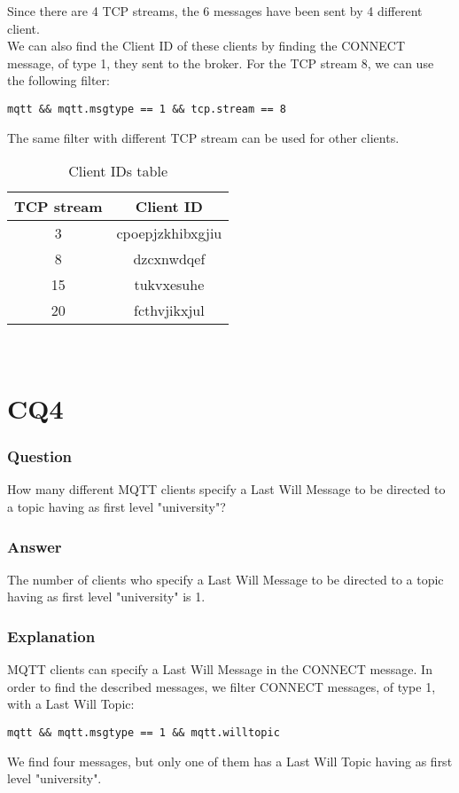 Since there are 4 TCP streams, the 6 messages have been sent by 4 different client.	\\
We can also find the Client ID of these clients by finding the CONNECT message, of type 1, they sent to the broker. For the TCP stream 8, we can use the following filter:
\begin{verbatim}
mqtt && mqtt.msgtype == 1 && tcp.stream == 8
\end{verbatim}
The same filter with different TCP stream can be used for other clients.

\begin{table}[H]
\centering 
\begin{tabular}{| c | c |}
	\hline 
	\rowcolor{bluepoli!40}
	\textbf{TCP stream} & \textbf{Client ID}\T\B \\
	\hline 
	3 & cpoepjzkhibxgjiu \T\B\\
	8 & dzcxnwdqef \T\B\\
	15 & tukvxesuhe \T\B\\
	20 & fcthvjikxjul \T\B\\
	\hline
\end{tabular}
\\[10pt]
\caption{Client IDs table}
\label{table:client_ids_table}
\end{table}

\section{CQ4}
\subsubsection{Question}
How many different MQTT clients specify a Last Will Message to be directed to a topic having as first level "university"?

\subsubsection{Answer}
The number of clients who specify a Last Will Message to be directed to a topic having as first level "university" is 1.

\subsubsection{Explanation}
MQTT clients can specify a Last Will Message in the CONNECT message. In order to find the described messages, we filter CONNECT messages, of type 1, with a Last Will Topic:
\begin{verbatim}
mqtt && mqtt.msgtype == 1 && mqtt.willtopic
\end{verbatim}
We find four messages, but only one of them has a Last Will Topic having as first level "university".\\


